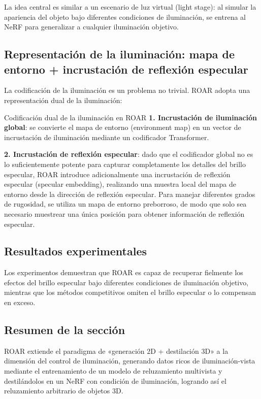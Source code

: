 \documentclass[a4paper]{article}
\begin{document}
La idea central es similar a un escenario de luz virtual (light stage): al simular la apariencia del objeto bajo diferentes condiciones de iluminación, se entrena al NeRF para generalizar a cualquier iluminación objetivo.

\subsection{Representación de la iluminación: mapa de entorno + incrustación de reflexión especular}

La codificación de la iluminación es un problema no trivial. ROAR adopta una representación dual de la iluminación:

\begin{importantbox}{Codificación dual de la iluminación en ROAR}
\textbf{1. Incrustación de iluminación global}: se convierte el mapa de entorno (environment map) en un vector de incrustación de iluminación mediante un codificador Transformer.

\textbf{2. Incrustación de reflexión especular}: dado que el codificador global no es lo suficientemente potente para capturar completamente los detalles del brillo especular, ROAR introduce adicionalmente una incrustación de reflexión especular (specular embedding), realizando una muestra local del mapa de entorno desde la dirección de reflexión especular. Para manejar diferentes grados de rugosidad, se utiliza un mapa de entorno preborroso, de modo que solo sea necesario muestrear una única posición para obtener información de reflexión especular.
\end{importantbox}

\subsection{Resultados experimentales}

Los experimentos demuestran que ROAR es capaz de recuperar fielmente los efectos del brillo especular bajo diferentes condiciones de iluminación objetivo, mientras que los métodos competitivos omiten el brillo especular o lo compensan en exceso.

\subsection{Resumen de la sección}

ROAR extiende el paradigma de «generación 2D + destilación 3D» a la dimensión del control de iluminación, generando datos ricos de iluminación-vista mediante el entrenamiento de un modelo de reluzamiento multivista y destilándolos en un NeRF con condición de iluminación, logrando así el reluzamiento arbitrario de objetos 3D.
\end{document}
